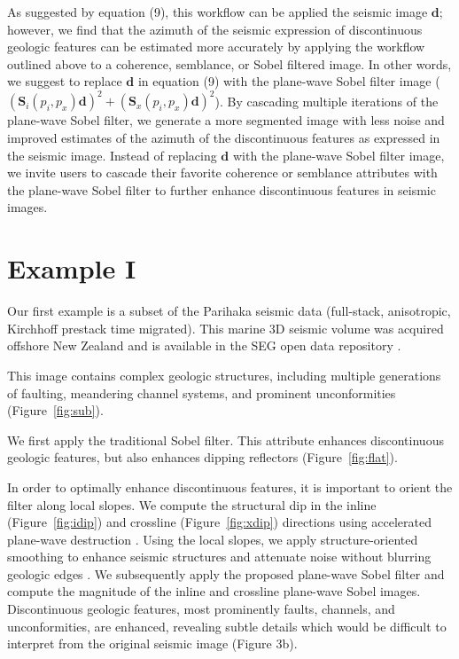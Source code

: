 As suggested by equation (9), this workflow can be applied the seismic image $\mathbf{d}$; however, we find that the azimuth of the seismic expression of discontinuous geologic features can be estimated more accurately by applying the workflow outlined above to a coherence, semblance, or Sobel filtered image.
In other words, we suggest to replace $\mathbf{d}$ in equation (9) with the plane-wave Sobel filter image ($(\mathbf{S}_i(p_i,p_x)\mathbf{d})^2+(\mathbf{S}_x(p_i,p_x)\mathbf{d})^2$).
By cascading multiple iterations of the plane-wave Sobel filter, we generate a more segmented image with less noise and improved estimates of the azimuth of the discontinuous features as expressed in the seismic image.
Instead of replacing $\mathbf{d}$ with the plane-wave Sobel filter image, we invite users to cascade their favorite coherence or semblance attributes with the plane-wave Sobel filter to further enhance discontinuous features in seismic images.

\section{Example I}
Our first example is a subset of the Parihaka seismic data (full-stack, anisotropic, Kirchhoff prestack time migrated).
This marine 3{D} seismic volume was acquired offshore New Zealand and is available in the SEG open data repository \cite[]{parihaka}.


This image contains complex geologic structures, including multiple generations of faulting, meandering channel systems, and prominent unconformities (Figure~\ref{fig:sub}).

We first apply the traditional Sobel filter.
This attribute enhances discontinuous geologic features, but also enhances dipping reflectors (Figure~\ref{fig:flat}).

In order to optimally enhance discontinuous features, it is important to orient the filter along local slopes.
We compute the structural dip in the inline (Figure~\ref{fig:idip}) and crossline (Figure~\ref{fig:xdip}) directions using accelerated plane-wave destruction \cite[]{apwd}.
Using the local slopes, we apply structure-oriented smoothing to enhance seismic structures and attenuate noise without blurring geologic edges \cite[]{liu}.
We subsequently apply the proposed plane-wave Sobel filter and compute the magnitude of the inline and crossline plane-wave Sobel images.
Discontinuous geologic features, most prominently faults, channels, and unconformities, are enhanced, revealing subtle details which would be difficult to interpret from the original seismic image (Figure 3b).

